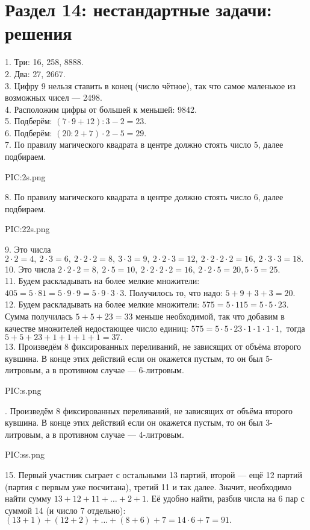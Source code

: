 \section{Раздел 14: нестандартные задачи: решения}
1. Три: 16, 258, 8888.\\
2. Два: 27, 2667.\\
3. Цифру 9 нельзя ставить в конец (число чётное), так что самое маленькое из возможных чисел --- 2498.\\
4. Расположим цифры от большей к меньшей: 9842.\\
5. Подберём: $(7\cdot9+12):3-2=23.$\\
6. Подберём: $(20:2+7)\cdot2-5=29.$\\
7. По правилу магического квадрата в центре должно стоять число 5, далее подбираем.
\begin{center}
{{PIC:2s.png}}
\end{center}
8. По правилу магического квадрата в центре должно стоять число 6, далее подбираем.
\begin{center}
{{PIC:22s.png}}
\end{center}
9. Это числа $2\cdot2=4,\ 2\cdot3=6,\ 2\cdot2\cdot2=8,\ 3\cdot3=9,\ 2\cdot2\cdot3=12,\ 2\cdot2\cdot2\cdot2=16,\ 2\cdot3\cdot3=18.$\\
10. Это числа $2\cdot2\cdot2=8,\ 2\cdot5=10,\ 2\cdot2\cdot2\cdot2=16,\ 2\cdot2\cdot5=20, 5\cdot5=25.$\\
11. Будем раскладывать на более мелкие множители: $405=5\cdot81=5\cdot9\cdot9=5\cdot9\cdot3\cdot3.$ Получилось то, что надо: $5+9+3+3=20.$\\
12. Будем раскладывать на более мелкие множители: $575=5\cdot115=5\cdot5\cdot23.$ Сумма получилась $5+5+23=33$ меньше необходимой, так что добавим в качестве множителей недостающее число единиц: $575=5\cdot5\cdot23\cdot1\cdot1\cdot1\cdot1,$ тогда $5+5+23+1+1+1+1=37.$\\
13. Произведём 8 фиксированных переливаний, не зависящих от объёма второго кувшина. В конце этих действий если он окажется пустым, то он был 5-литровым, а в противном случае --- 6-литровым.
\begin{center}
{{PIC:s.png}}
\end{center}
\newpage
{}. Произведём 8 фиксированных переливаний, не зависящих от объёма второго кувшина. В конце этих действий если он окажется пустым, то он был 3-литровым, а в противном случае --- 4-литровым.
\begin{center}
{{PIC:ss.png}}
\end{center}
15. Первый участник сыграет с остальными 13 партий, второй --- ещё 12 партий (партия с первым уже посчитана), третий 11 и так далее. Значит, необходимо найти сумму $13+12+11+\ldots+2+1.$ Её удобно найти, разбив числа на 6 пар с суммой 14 (и число 7 отдельно): $(13+1)+(12+2)+\ldots+(8+6)+7=14\cdot6+7=91.$\\
